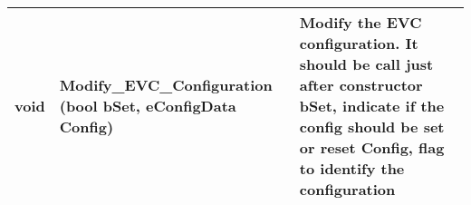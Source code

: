 \documentclass{template/openetcs_article}
\begin{document}
\begin{longtable}{|l|l|l|}
	\hline
		\begin{minipage}[t]{0.25\linewidth} void \end{minipage} 
	&	\begin{minipage}[t]{0.30\linewidth} Modify\_EVC\_Configuration (bool bSet, eConfigData Config) \end{minipage} 
	&	\begin{minipage}[t]{0.50\linewidth} Modify the EVC configuration. It should be call just after constructor
	\newline [in] bSet, indicate if the config should be set or reset
	\newline [in] Config, flag to identify the configuration\end{minipage} \\
	\hline
\end{longtable}
\end{document}
